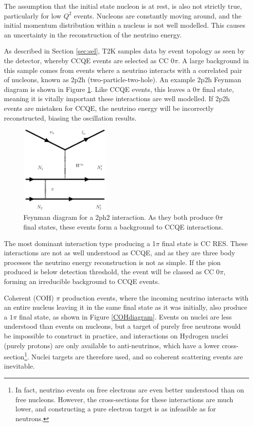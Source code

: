 The assumption that the initial state nucleon is at rest, is also not strictly true, particularly for low $Q^2$ events. Nucleons are constantly moving around, and the initial momentum distribution within a nucleus is not well modelled. This causes an uncertainty in the reconstruction of the neutrino energy.

As described in Section \ref{sec:sel}, T2K samples data by event topology as seen by the detector, whereby CCQE events are selected as CC 0$\pi$. A large background in this sample comes from events where a neutrino interacts with a correlated pair of nucleons, known as 2p2h (two-particle-two-hole). An example 2p2h Feynman diagram is shown in Figure \ref{2p2hdiagram}. Like CCQE events, this leaves a 0$\pi$ final state, meaning it is vitally important these interactions are well modelled. If 2p2h events are mistaken for CCQE, the neutrino energy will be incorrectly reconstructed, biasing the oscillation results.

\begin{figure}[!htbp]
\vspace{20pt}
\centering
\includegraphics*[width=0.4\textwidth,clip]{figs/feynman2p2h}
\caption{Feynman diagram for a 2ph2 interaction. As they both produce 0$\pi$ final states, these events form a background to CCQE interactions.
} \label{2p2hdiagram}
\end{figure}

The most dominant interaction type producing a 1$\pi$ final state is CC RES. These interactions are not as well understood as CCQE, and as they are three body processes the neutrino energy reconstruction is not as simple. If the pion produced is below detection threshold, the event will be classed as CC 0$\pi$, forming an irreducible background to CCQE events. 

Coherent (COH) $\pi$ production events, where the incoming neutrino interacts with an entire nucleus leaving it in the same final state as it was initially, also produce a $1\pi$ final state, as shown in Figure \ref{COHdiagram}. Events on nuclei are less understood than events on nucleons, but a target of purely free neutrons would be impossible to construct in practice, and interactions on Hydrogen nuclei (purely protons) are only available to anti-neutrinos, which have a lower cross-section\footnote{In fact, neutrino events on free electrons are even better understood than on free nucleons. However, the cross-sections for these interactions are much lower, and constructing a pure electron target is as infeasible as for neutrons.}. Nuclei targets are therefore used, and so coherent scattering events are inevitable.

